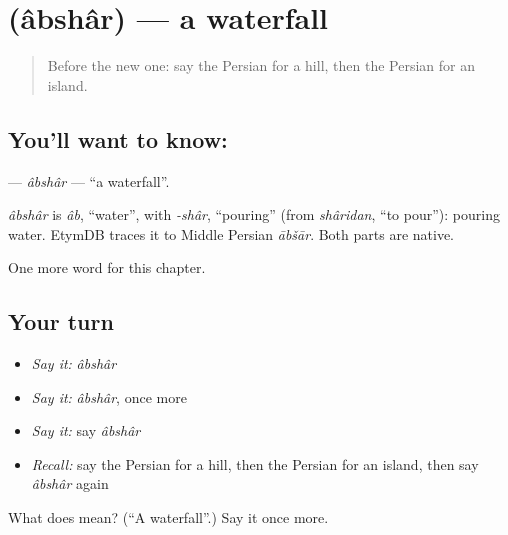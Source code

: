 \section[\texorpdfstring{\fa{آبشار} (âbshâr)}{آبشار (âbshâr)}]{ (âbshâr) — a waterfall}

\label{lesson:FA-C103-abshar}



\begin{quote}
Before the new one: say the Persian for a hill, then the Persian for an island.
\end{quote}

\subsection*{You'll want to know: }
\textbf{} — \emph{âbshâr} — \textquotedblleft{}a waterfall\textquotedblright{}.

\begin{cousinweb}
\emph{âbshâr} is \emph{âb}, \textquotedblleft{}water\textquotedblright{}, with \emph{-shâr}, \textquotedblleft{}pouring\textquotedblright{} (from \emph{shâridan}, \textquotedblleft{}to pour\textquotedblright{}): pouring water. EtymDB traces it to Middle Persian \emph{ābšār}. Both parts are native.
\end{cousinweb}

\begin{grammarlens}[title={What you've built}]
One more word for this chapter.
\end{grammarlens}

\subsection*{Your turn}
\begin{itemize}
\raggedright
  \item \emph{Say it:} \emph{âbshâr}
  \item \emph{Say it:} \emph{âbshâr}, once more
  \item \emph{Say it:} say \emph{âbshâr}
  \item \emph{Recall:} say the Persian for a hill, then the Persian for an island, then say \emph{âbshâr} again
\end{itemize}

\begin{tcolorbox}[breakable,colback=teal!4,colframe=teal!35!black,title={Before you move on}]
What does  mean? (\textquotedblleft{}A waterfall\textquotedblright{}.) Say it once more.
\end{tcolorbox}
